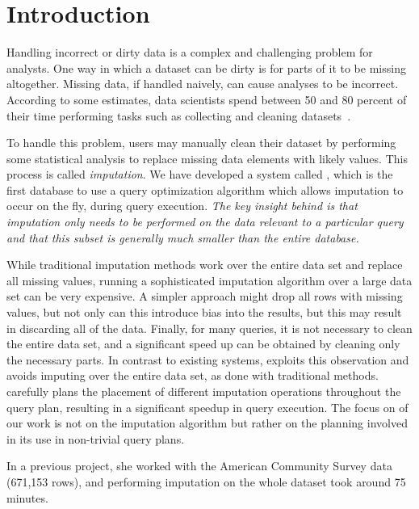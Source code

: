 \section{Introduction}

Handling incorrect or dirty data is a complex and challenging problem for analysts.
One way in which a dataset can be dirty is for parts of it to be missing altogether.
Missing data, if handled naively, can cause analyses to be incorrect.
According to some estimates, data scientists spend between 50 and 80 percent of their time performing tasks such as collecting and cleaning datasets~\cite{data-science-cleaning}.

To handle this problem, users may manually clean their dataset by performing some statistical analysis to replace missing data elements with likely values.
This process is called \emph{imputation}.
We have developed a system called \ProjectName{}, which is the first database to use a query optimization algorithm which allows imputation to occur on the fly, during query execution. \emph{The key insight behind \ProjectName{} is that imputation
only needs to be performed on the data relevant to a particular query and
that this subset is generally much smaller than the entire database.} 

While traditional imputation methods work over the entire data set and replace all missing values, running a sophisticated imputation algorithm over a large data set can be very expensive.
A simpler approach might drop all rows with missing values, but not only can this introduce bias into the results, but this may result in discarding all of the data.
Finally, for many queries, it is not necessary to clean the entire data set, and a significant speed up can be obtained by cleaning only the necessary parts.
In contrast to existing systems, \ProjectName{} exploits this observation and avoids imputing over the entire data set, as done with traditional methods. \ProjectName{}
carefully plans the placement of different imputation operations throughout the query plan, resulting in a 
significant speedup in query execution. The focus on of our work is not on the imputation algorithm but rather on the planning involved in its use in non-trivial query plans. 

{In a previous project, she
worked with the American Community Survey data (671,153 rows), and performing imputation on the whole
dataset took around 75 minutes.}


